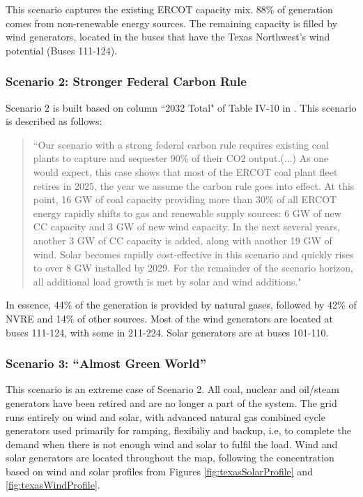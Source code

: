 \documentclass[12pt,LUDisStyle,twosided]{book}
\begin{document}
This scenario captures the existing ERCOT capacity mix. 88\% of generation comes from non-renewable energy sources. The remaining capacity is filled by wind generators, located in the buses that have the Texas Northwest's wind potential (Buses 111-124).

\subsubsection{Scenario 2: Stronger Federal Carbon Rule}

Scenario 2 is built based on column ``2032 Total" of Table IV-10 in \cite{shavel}. This scenario is described as follows:

\begin{quotation}
``Our scenario with a strong federal carbon rule requires existing coal plants to capture and sequester 90\% of their CO2 output.(...)
As one would expect, this case shows that most of the ERCOT coal plant fleet retires in 2025, the year we assume the carbon rule goes into effect. At this point, 16 GW of coal capacity providing more than 30\% of all ERCOT energy rapidly shifts to gas and renewable supply sources: 6 GW of new CC capacity and 3 GW of new wind capacity. In the next several years, another 3 GW of CC capacity is added, along with another 19 GW of wind. Solar becomes rapidly cost-effective in this scenario and quickly rises to over 8 GW installed by 2029. For the remainder of the scenario horizon, all additional load growth is met by solar and wind additions."
\end{quotation}

In essence, 44\% of the generation is provided by natural gases, followed by 42\% of NVRE and 14\% of other sources. Most of the wind generators are located at buses 111-124, with some in 211-224. Solar generators are at buses 101-110.


\subsubsection{Scenario 3: ``Almost Green World''}

This scenario is an extreme case of Scenario 2. All coal, nuclear and oil/steam generators have been retired and are no longer a part of the system. The grid runs entirely on wind and solar, with advanced natural gas combined cycle generators used primarily for ramping, flexibiliy and backup, i.e, to complete the demand when there is not enough wind and solar to fulfil the load. Wind and solar generators are located throughout the map, following the concentration based on wind and solar profiles from Figures \ref{fig:texasSolarProfile} and \ref{fig:texasWindProfile}.
\end{document}
